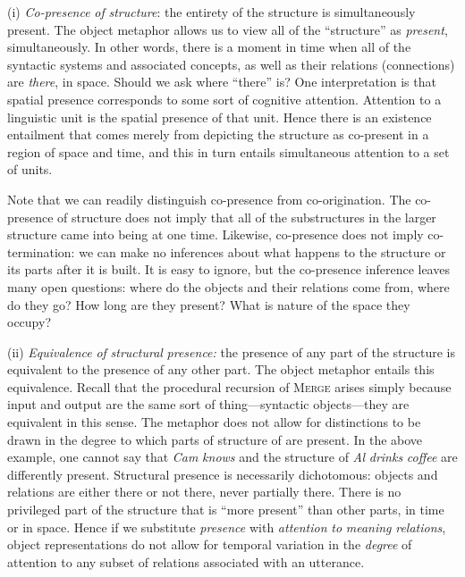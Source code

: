 (i) \textit{Co-presence} \textit{of} \textit{structure}: the entirety of the structure is simultaneously present. The object metaphor allows us to view all of the “structure” as \textit{present}, simultaneously. In other words, there is a moment in time when all of the syntactic systems and associated concepts, as well as their relations (connections) are \textit{there}, in space. Should we ask where “there” is? One interpretation is that spatial presence corresponds to some sort of cognitive attention. Attention to a linguistic unit is the spatial presence of that unit. Hence there is an existence entailment that comes merely from depicting the structure as co-present in a region of space and time, and this in turn entails simultaneous attention to a set of units.

  Note that we can readily distinguish co-presence from co-origination. The co-presence of structure does not imply that all of the substructures in the larger structure came into being at one time. Likewise, co-presence does not imply co-termination: we can make no inferences about what happens to the structure or its parts after it is built. It is easy to ignore, but the co-presence inference leaves many open questions: where do the objects and their relations come from, where do they go? How long are they present? What is nature of the space they occupy?

(ii) \textit{Equivalence} \textit{of} \textit{structural} \textit{presence:} the presence of any part of the structure is equivalent to the presence of any other part. The object metaphor entails this equivalence. Recall that the procedural recursion of \textsc{Merge} arises simply because input and output are the same sort of thing—syntactic objects—they are equivalent in this sense. The metaphor does not allow for distinctions to be drawn in the degree to which parts of structure of are present. In the above example, one cannot say that \textit{Cam} \textit{knows} and the structure of \textit{Al} \textit{drinks} \textit{coffee} are differently present. Structural presence is necessarily dichotomous: objects and relations are either there or not there, never partially there. There is no privileged part of the structure that is “more present” than other parts, in time or in space. Hence if we substitute \textit{presence} with \textit{attention} \textit{to} \textit{meaning} \textit{relations}, object representations do not allow for temporal variation in the \textit{degree} of attention to any subset of relations associated with an utterance. 

